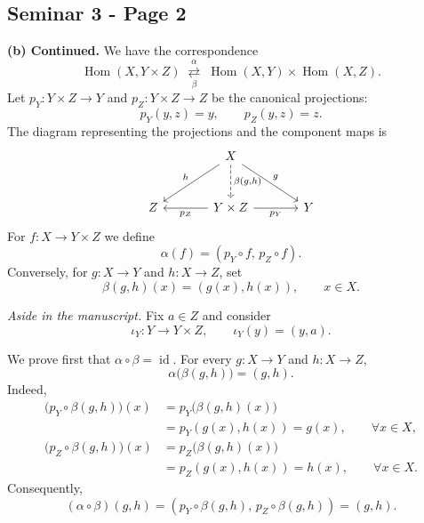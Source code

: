 
\subsection*{Seminar 3 - Page 2}

\noindent\textbf{(b) Continued.} We have the correspondence
\[
  \operatorname{Hom}(X,Y\times Z)
  \;\overset{\alpha}{\underset{\beta}{\rightleftarrows}}\;
  \operatorname{Hom}(X,Y)\times\operatorname{Hom}(X,Z).
\]
Let $p_Y:Y\times Z\to Y$ and $p_Z:Y\times Z\to Z$ be the
canonical projections:
\[
 p_Y(y,z)=y,\qquad p_Z(y,z)=z.
\]
The diagram representing the projections and the component maps is
\[
\begin{tikzcd}[column sep=large, row sep=large]
 & X \arrow[dl, "h"'] \arrow[dr, "g"]
     \arrow[d, dashed, "{\beta(g,h)}"] & \\
 Z & Y\times Z \arrow[l, "p_Z"] \arrow[r, "p_Y"'] & Y
\end{tikzcd}
\]
For $f:X\to Y\times Z$ we define
\[
  \alpha(f)=(p_Y\circ f,\,p_Z\circ f).
\]
Conversely, for $g:X\to Y$ and $h:X\to Z$, set
\[
  \beta(g,h)(x)=(g(x),h(x)),\qquad x\in X.
\]

\medskip
\noindent\emph{Aside in the manuscript.} Fix $a\in Z$ and consider
\[
 \iota_Y:Y\longrightarrow Y\times Z,\qquad
 \iota_Y(y)=(y,a).
\]

\medskip
\noindent We prove first that $\alpha\circ\beta=\operatorname{id}$.
For every $g:X\to Y$ and $h:X\to Z$,
\[
  \alpha\bigl(\beta(g,h)\bigr)=(g,h).
\]
Indeed,
\[
\begin{aligned}
 \bigl(p_Y\circ\beta(g,h)\bigr)(x)
   &=p_Y\bigl(\beta(g,h)(x)\bigr) \\
   &=p_Y(g(x),h(x))=g(x),
 \qquad \forall x\in X,\\[3pt]
 \bigl(p_Z\circ\beta(g,h)\bigr)(x)
   &=p_Z\bigl(\beta(g,h)(x)\bigr) \\
   &=p_Z(g(x),h(x))=h(x),
 \qquad \forall x\in X.
\end{aligned}
\]
Consequently,
\[
  (\alpha\circ\beta)(g,h)
    =(p_Y\circ\beta(g,h),\,p_Z\circ\beta(g,h))
    =(g,h).
\]


